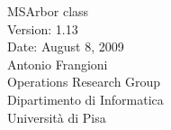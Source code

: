 \documentclass[a4paper]{book}
\begin{document}
\setlength{\footrulewidth}{0.4pt}
\begin{titlepage}
\vspace*{7cm}
\begin{center}
{\Large MSArbor class}\\
\vspace*{1cm}
Version: 1.13\\
Date: August 8, 2009\\
\vspace*{1cm}
{\large Antonio Frangioni}\\
\vspace*{0.5cm}
Operations Research Group\\
Dipartimento di Informatica\\
Universit\`a di Pisa\\
\end{center}
\end{titlepage}
{}
\tableofcontents
{}
\end{document}
